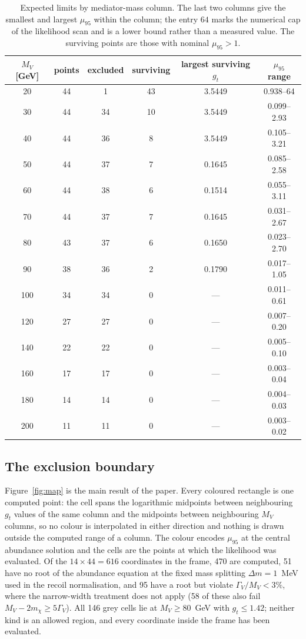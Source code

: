 \begin{table}[t]
\centering
\caption{Expected limits by mediator-mass column. The last two columns give the smallest and largest $\mu_{95}$ within the column; the entry $64$ marks the numerical cap of the likelihood scan and is a lower bound rather than a measured value. The surviving points are those with nominal $\mu_{95}>1$.}
\label{tab:columns}
\begin{tabular}{cccccc}
\toprule
$M_V$ [GeV] & points & excluded & surviving & largest surviving $g_t$ & $\mu_{95}$ range \\
\midrule
 20 & 44 & 1 & 43 & 3.5449 & 0.938--64 \\
 30 & 44 & 34 & 10 & 3.5449 & 0.099--2.93 \\
 40 & 44 & 36 & 8 & 3.5449 & 0.105--3.21 \\
 50 & 44 & 37 & 7 & 0.1645 & 0.085--2.58 \\
 60 & 44 & 38 & 6 & 0.1514 & 0.055--3.11 \\
 70 & 44 & 37 & 7 & 0.1645 & 0.031--2.67 \\
 80 & 43 & 37 & 6 & 0.1650 & 0.023--2.70 \\
 90 & 38 & 36 & 2 & 0.1790 & 0.017--1.05 \\
100 & 34 & 34 & 0 & --- & 0.011--0.61 \\
120 & 27 & 27 & 0 & --- & 0.007--0.20 \\
140 & 22 & 22 & 0 & --- & 0.005--0.10 \\
160 & 17 & 17 & 0 & --- & 0.003--0.04 \\
180 & 14 & 14 & 0 & --- & 0.004--0.03 \\
200 & 11 & 11 & 0 & --- & 0.003--0.02 \\
\bottomrule
\end{tabular}
\end{table}

\subsection{The exclusion boundary}

Figure~\ref{fig:map} is the main result of the paper. Every coloured rectangle is one computed point: the cell spans the logarithmic midpoints between neighbouring $g_t$ values of the same column and the midpoints between neighbouring $M_V$ columns, so no colour is interpolated in either direction and nothing is drawn outside the computed range of a column. The colour encodes $\mu_{95}$ at the central abundance solution and the cells are the points at which the likelihood was evaluated. Of the $14\times44=616$ coordinates in the frame, 470 are computed, 51 have no root of the abundance equation at the fixed mass splitting $\Delta m=1$~MeV used in the recoil normalisation, and 95 have a root but violate $\Gamma_V/M_V<3\%$, where the narrow-width treatment does not apply (58 of these also fail $M_V-2m_\chi\ge5\Gamma_V$). All 146 grey cells lie at $M_V\ge80$~GeV with $g_t\le1.42$; neither kind is an allowed region, and every coordinate inside the frame has been evaluated.

